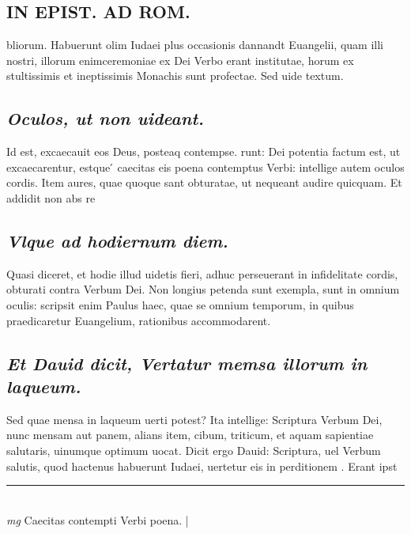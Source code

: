 \documentclass{article}
\begin{document}
\begin{pages}
\section*{IN EPIST. AD ROM.  }
\marginpar{[ p.117 ]}\pstart bliorum. Habuerunt olim Iudaei plus occasionis dannandt Euangelii, quam illi nostri, illorum enimceremoniae ex Dei Verbo erant institutae, horum ex stultissimis et ineptissimis Monachis sunt profectae. Sed uide textum.   \pend
{}
{}
\subsection*{\textit{Oculos, ut non uideant. }}\pstart Id est, excaecauit eos Deus, posteaq contempse. runt: Dei potentia factum est, ut excaecarentur, estque ́ caecitas eis poena contemptus Verbi: intellige autem oculos cordis. Item aures, quae quoque sant obturatae, ut nequeant audire quicquam. Et addidit non abs re  \pend
{}
{}
\subsection*{\textit{Vlque ad hodiernum diem. }}\pstart Quasi diceret, et hodie illud uidetis fieri, adhuc perseuerant in infidelitate cordis, obturati contra Verbum Dei. Non longius petenda sunt exempla, sunt in omnium oculis: scripsit enim Paulus haec, quae se omnium temporum, in quibus praedicaretur Euangelium, rationibus accommodarent.  \pend
{}
{}
\subsection*{\textit{Et Dauid dicit, Vertatur memsa illorum in laqueum. }}\pstart Sed quae mensa in laqueum uerti potest? Ita intellige: Scriptura Verbum Dei, nunc mensam aut panem, alians item, cibum, triticum, et aquam sapientiae salutaris, uinumque optimum uocat. Dicit ergo Dauid: Scriptura, uel Verbum salutis, quod hactenus habuerunt Iudaei, uertetur eis in perditionem . Erant ipst  \pend
\vspace{0.5cm}\noindent
\vspace{0.2cm}\rule{1cm}{0.2pt}\\ 
\hspace{0.2cm}\textit{mg}
\footnotesize Caecitas contempti Verbi poena.  
\normalsize| 

\end{pages}
\end{document}
